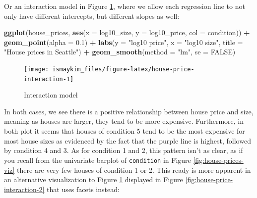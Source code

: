 \documentclass[12pt,]{krantz}
\makeatletter
\newenvironment{Shaded}{\begin{snugshade}}{\end{snugshade}}
\newcommand{\KeywordTok}[1]{\textcolor[rgb]{0.27,0.27,0.27}{\textbf{#1}}}
\newcommand{\DataTypeTok}[1]{\textcolor[rgb]{0.27,0.27,0.27}{#1}}
\newcommand{\FloatTok}[1]{\textcolor[rgb]{0.06,0.06,0.06}{#1}}
\newcommand{\StringTok}[1]{\textcolor[rgb]{0.5,0.5,0.5}{#1}}
\newcommand{\OtherTok}[1]{\textcolor[rgb]{0.37,0.37,0.37}{#1}}
\newcommand{\OperatorTok}[1]{\textcolor[rgb]{0.43,0.43,0.43}{\textbf{#1}}}
\newcommand{\NormalTok}[1]{#1}
\newenvironment{kframe}{%
\medskip{}
\setlength{\fboxsep}{.8em}
 \def\at@end@of@kframe{}%
 \ifinner\ifhmode%
  \def\at@end@of@kframe{\end{minipage}}%
  \begin{minipage}{\columnwidth}%
 \fi\fi%
 \def\FrameCommand##1{\hskip\@totalleftmargin \hskip-\fboxsep
 \colorbox{shadecolor}{##1}\hskip-\fboxsep
     \hskip-\linewidth \hskip-\@totalleftmargin \hskip\columnwidth}%
 \MakeFramed {\advance\hsize-\width
   \@totalleftmargin\z@ \linewidth\hsize
   \@setminipage}}%
 {\par\unskip\endMakeFramed%
 \at@end@of@kframe}
\renewenvironment{Shaded}{\begin{kframe}}{\end{kframe}}
\makeatother
\begin{document}
Or an interaction model in Figure \ref{fig:house-price-interaction},
where we allow each regression line to not only have different
intercepts, but different slopes as well:

\begin{Shaded}
\begin{Highlighting}[]
\KeywordTok{ggplot}\NormalTok{(house_prices, }\KeywordTok{aes}\NormalTok{(}\DataTypeTok{x =}\NormalTok{ log10_size, }\DataTypeTok{y =}\NormalTok{ log10_price, }\DataTypeTok{col =}\NormalTok{ condition)) }\OperatorTok{+}
\StringTok{  }\KeywordTok{geom_point}\NormalTok{(}\DataTypeTok{alpha =} \FloatTok{0.1}\NormalTok{) }\OperatorTok{+}
\StringTok{  }\KeywordTok{labs}\NormalTok{(}\DataTypeTok{y =} \StringTok{"log10 price"}\NormalTok{, }\DataTypeTok{x =} \StringTok{"log10 size"}\NormalTok{, }\DataTypeTok{title =} \StringTok{"House prices in Seattle"}\NormalTok{) }\OperatorTok{+}
\StringTok{  }\KeywordTok{geom_smooth}\NormalTok{(}\DataTypeTok{method =} \StringTok{"lm"}\NormalTok{, }\DataTypeTok{se =} \OtherTok{FALSE}\NormalTok{)}
\end{Highlighting}
\end{Shaded}

\begin{figure}

{\centering \texttt{[image: ismaykim\_files/figure-latex/house-price-interaction-1]} 

}

\caption{Interaction model}\label{fig:house-price-interaction}
\end{figure}

In both cases, we see there is a positive relationship between house
price and size, meaning as houses are larger, they tend to be more
expensive. Furthermore, in both plot it seems that houses of condition 5
tend to be the most expensive for most house sizes as evidenced by the
fact that the purple line is highest, followed by condition 4 and 3. As
for condition 1 and 2, this pattern isn't as clear, as if you recall
from the univariate barplot of \texttt{condition} in Figure
\ref{fig:house-prices-viz} there are very few houses of condition 1 or
2. This ready is more apparent in an alternative visualization to Figure
\ref{fig:house-price-interaction} displayed in Figure
\ref{fig:house-price-interaction-2} that uses facets instead:
\end{document}
